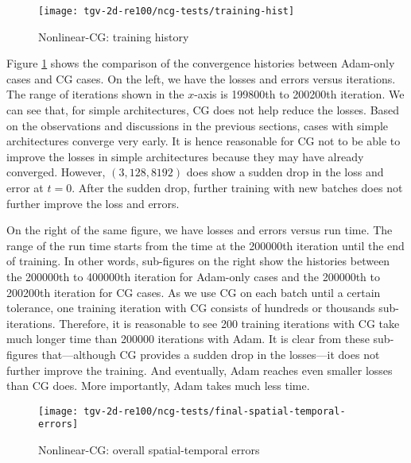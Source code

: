 \begin{figure}[hbt!]
    \centering%
    \texttt{[image: tgv-2d-re100/ncg-tests/training-hist]}%
    \caption[%
        Nonlinear-CG: training history%
    ]{%
        Nonlinear-CG: training history%
    }\label{fig:ncg-tests-train-hist}%
\end{figure}

Figure \ref{fig:ncg-tests-train-hist} shows the comparison of the convergence histories between Adam-only cases and CG cases.
On the left, we have the losses and errors versus iterations.
The range of iterations shown in the $x$-axis is \num{199800}th to \num{200200}th iteration.
We can see that, for simple architectures, CG does not help reduce the losses.
Based on the observations and discussions in the previous sections, cases with simple architectures converge very early.
It is hence reasonable for CG not to be able to improve the losses in simple architectures because they may have already converged.
However, $(3, 128, 8192)$ does show a sudden drop in the loss and error at $t=0$.
After the sudden drop, further training with new batches does not further improve the loss and errors.

On the right of the same figure, we have losses and errors versus run time.
The range of the run time starts from the time at the \num{200000}th iteration until the end of training.
In other words, sub-figures on the right show the histories between the \num{200000}th to \num{400000}th iteration for Adam-only cases and the \num{200000}th to \num{200200}th iteration for CG cases.
As we use CG on each batch until a certain tolerance, one training iteration with CG consists of hundreds or thousands sub-iterations.
Therefore, it is reasonable to see 200 training iterations with CG take much longer time than \num{200000} iterations with Adam.
It is clear from these sub-figures that---although CG provides a sudden drop in the losses---it does not further improve the training.
And eventually, Adam reaches even smaller losses than CG does.
More importantly, Adam takes much less time.

\begin{figure}[hbt!]
    \centering%
    \texttt{[image: tgv-2d-re100/ncg-tests/final-spatial-temporal-errors]}%
    \caption[%
        Nonlinear-CG: overall spatial-temporal errors%
    ]{%
        Nonlinear-CG: overall spatial-temporal errors%
    }\label{fig:ncg-tests-final-sterrs}%
\end{figure}

